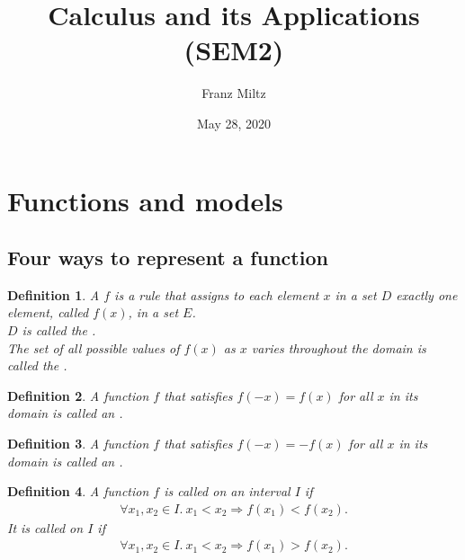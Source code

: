 \documentclass{article}
\theoremstyle{sltheorem}
\newtheorem{definition}{Definition}[section]
\begin{document}
\title{Calculus and its Applications (SEM2)}
\author{Franz Miltz}
\date{May 28, 2020}
\maketitle
\tableofcontents
\pagebreak
\section{Functions and models}
\subsection{Four ways to represent a function}
\begin{definition}
    A  $f$ is a rule that assigns to each element $x$ in a set $D$ exactly one element, called $f(x)$, in a set $E$.\\
    $D$ is called the .\\
    The set of all possible values of $f(x)$ as $x$ varies throughout the domain is called the .\\
\end{definition}
\begin{definition}
    A function $f$ that satisfies $f(-x)=f(x)$ for all $x$ in its domain is called an .
\end{definition}
\begin{definition}
    A function $f$ that satisfies $f(-x)=-f(x)$ for all $x$ in its domain is called an .
\end{definition}
\begin{definition}
    A function $f$ is called  on an interval $I$ if
    \begin{align*}
        \forall x_1, x_2 \in I.\:x_1 < x_2 \Rightarrow f(x_1) < f(x_2).
    \end{align*}
    It is called  on $I$ if
    \begin{align*}
        \forall x_1, x_2 \in I.\: x_1 < x_2 \Rightarrow f(x_1) > f(x_2).
    \end{align*}
\end{definition}
\end{document}
